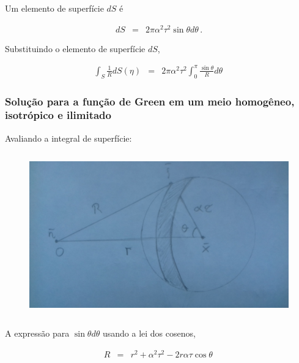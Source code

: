 \documentclass[xcolor=table]{beamer}
\begin{document}
\begin{frame}
\begin{figure}[h!]
\begin{subfigure}[t]{0.40\linewidth}
  \end{subfigure}    
  \end{figure}  
\begin{flushleft}
 Um elemento de superf\'icie $dS$ \'e 
\end{flushleft}
\begin{eqnarray}
  \label{ten1}
   dS &=& 2\pi \alpha^2 \tau^2 \sin \theta d\theta \, .
\end{eqnarray}
\begin{flushleft}
 Substituindo o elemento de superf\'icie $dS$,
\end{flushleft}
\begin{eqnarray}
  \label{ten1}
   \int_{S} \frac{1}{R} dS(\eta)  &=& 2\pi \alpha^2 \tau^2 \int_{0}^{\pi} \frac{\sin \theta}{R} d\theta \, 
\end{eqnarray}

\end{frame}%



\begin{frame}
\frametitle{\textbf{Solu\c{c}\~ao para a fun\c{c}\~ao de Green em um meio homog\^eneo, isotr\'opico e ilimitado}}
\begin{flushleft}
    \textcolor{red!60!black}{Avaliando a integral de superf\'icie:}
\end{flushleft}

\begin{columns}        
  \begin{column}{0.60\textwidth}  
  \begin{figure}[h!]   
    \includegraphics[scale=0.058]{Figura/Fig5.jpg}       
  \end{figure}
  \end{column}
\end{columns}

\begin{flushleft}
 A express\~ao para $\sin \theta d\theta$ usando a lei dos cosenos,
\end{flushleft}
\begin{eqnarray}
  \label{ten1}
   R &=&  r^2 + \alpha^2 \tau^2  - 2r\alpha\tau \cos \theta\,
\end{eqnarray}

\end{frame}%
\end{document}
